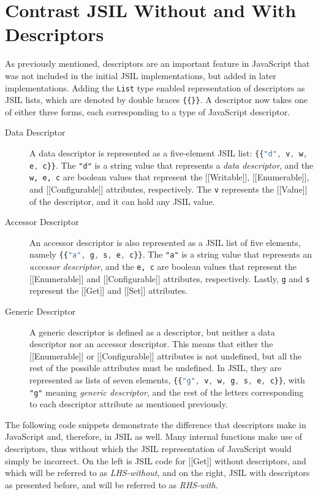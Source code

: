 \documentclass[a4paper,11pt,twoside]{report}
\def\jsinline{\lstinline[language=JavaScript, basicstyle=\small]}%\end{lstlisting}
\begin{document}
\section{Contrast JSIL Without and With Descriptors}
As previously mentioned, descriptors are an important feature in JavaScript that was not included in the initial JSIL implementations, but added in later implementations. Adding the \texttt{List} type enabled representation of descriptors as JSIL lists, which are denoted by double braces \texttt{\{\{\}\}}. A descriptor now takes one of either three forms, each corresponding to a type of JavaScript descriptor.
\begin{description}

\item[Data Descriptor] A data descriptor is represented as a five-element JSIL list: \jsinline|{{"d", v, w, e, c}}|. The \texttt{"d"} is a string value that represents a \textit{data descriptor}, and the \texttt{w, e, c} are boolean values that represent the [[Writable]], [[Enumerable]], and [[Configurable]] attributes, respectively. The \texttt{v} represents the [[Value]] of the descriptor, and it can hold any JSIL value.

\item[Accessor Descriptor] An accessor descriptor is also represented as a JSIL list of five elements, namely \jsinline|{{"a", g, s, e, c}}|. The \texttt{"a"} is a string value that represents an \textit{accessor descriptor}, and the \texttt{e, c} are boolean values that represent the [[Enumerable]] and [[Configurable]] attributes, respectively. Lastly, \texttt{g} and \texttt{s} represent the [[Get]] and [[Set]] attributes.

\item[Generic Descriptor] A generic descriptor is defined as a descriptor, but neither a data descriptor nor an accessor descriptor. This means that either the [[Enumerable]] or [[Configurable]] attributes is not undefined, but all the rest of the possible attributes must be undefined. In JSIL, they are represented as lists of seven elements, \jsinline|{{"g", v, w, g, s, e, c}}|, with \texttt{"g"} meaning \textit{generic descriptor}, and the rest of the letters corresponding to each descriptor attribute as mentioned previously.
\end{description}

The following code snippets demonstrate the difference that descriptors make in JavaScript and, therefore, in JSIL as well. Many internal functions make use of descriptors, thus without which the JSIL representation of JavaScript would simply be incorrect. On the left is JSIL code for [[Get]] without descriptors, and which will be referred to as \textit{LHS-without}, and on the right, JSIL with descriptors as presented before, and will be referred to as \textit{RHS-with}.
\end{document}
